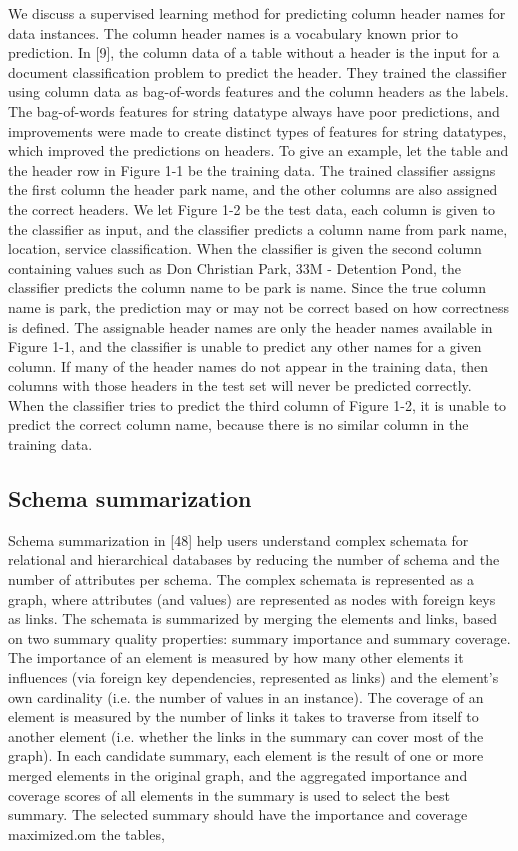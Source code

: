 We discuss a supervised learning method for predicting column header names for data instances. The column header names is a vocabulary known prior to prediction. In [9], the column data of a table without a header is the input for a document classification problem to predict the header. They trained the classifier using column data as bag-of-words features and the column headers as the labels. The bag-of-words features for string datatype always have poor predictions, and improvements were made to create distinct types of features for string datatypes, which improved the predictions on headers.
To give an example, let the table and the header row in Figure 1-1 be the training data. The trained classifier assigns the first column the header park name, and the other columns are also assigned the correct headers. We let Figure 1-2 be the test data, each column is given to the classifier as input, and the classifier predicts a column name from {park name, location, service classification}. When the classifier is given the second column containing values such as Don Christian Park, 33M - Detention Pond, the classifier predicts the column name to be park is
name. Since the true column name is park, the prediction may or may not be correct based on how correctness is defined.
The assignable header names are only the header names available in Figure 1-1, and the classifier is unable to predict any other names for a given column. If many of the header names do not appear in the training data, then columns with those headers in the test set will never be predicted correctly. When the classifier tries to predict the third column of Figure 1-2, it is unable to predict the correct column name, because there is no similar column in the training data.

\subsection{Schema summarization}
\label{ssec:SchemaSummarization}

Schema summarization in [48] help users understand complex schemata for relational and hierarchical databases by reducing the number of schema and the number of attributes per schema. The complex schemata is represented as a graph, where attributes (and values) are represented as nodes with foreign keys as links. The schemata is summarized by merging the elements and links, based on two summary quality properties: summary importance and summary coverage. The importance of an element is measured by how many other elements it influences (via foreign key dependencies, represented as links) and the element's own cardinality (i.e. the number of values in an instance). The coverage of an element is measured by the number of links it takes to traverse from itself to another element (i.e. whether the links in the summary can cover most of the graph). In each candidate summary, each element is the result of one or more merged elements in the original graph, and the aggregated importance and coverage scores of all elements in the summary is used to select the best summary. The selected summary should have the importance and coverage maximized.om the tables,

